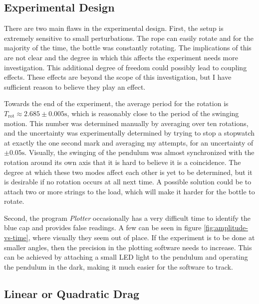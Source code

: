 \documentclass[%
 reprint,
 amsmath,amssymb
 aps,
]{revtex4-2}
\begin{document}
\subsection{Experimental Design}
There are two main flaws in the experimental design. First, the setup is extremely sensitive to small perturbations. The rope can easily rotate and for the majority of the time, the bottle was constantly rotating. The implications of this are not clear and the degree in which this affects the experiment needs more investigation. This additional degree of freedom could possibly lead to coupling effects. These effects are beyond the scope of this investigation, but I have sufficient reason to believe they play an effect. 

Towards the end of the experiment, the average period for the rotation is $T_\text{rot}\approx 2.685\pm 0.005\si{\second}$, which is reasonably close to the period of the swinging motion. This number was determined manually by averaging over ten rotations, and the uncertainty was experimentally determined by trying to stop a stopwatch at exactly the one second mark and averaging my attempts, for an uncertainty of $\pm 0.05\si{\second}$. Visually, the swinging of the pendulum was almost synchronized with the rotation around its own axis that it is hard to believe it is a coincidence. The degree at which these two modes affect each other is yet to be determined, but it is desirable if no rotation occurs at all next time. A possible solution could be to attach two or more strings to the load, which will make it harder for the bottle to rotate.

Second, the program \textit{Plotter} occasionally has a very difficult time to identify the blue cap and provides false readings. A few can be seen in figure \ref{fig:amplitude-vs-time}, where visually they seem out of place. If the experiment is to be done at smaller angles, then the precision in the plotting software needs to increase. This can be achieved by attaching a small LED light to the pendulum and operating the pendulum in the dark, making it much easier for the software to track.

\subsection{Linear or Quadratic Drag}
\end{document}
